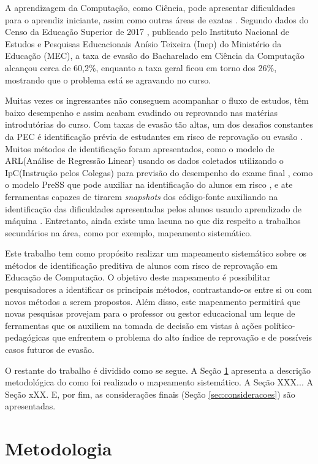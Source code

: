 \documentclass[12pt]{article}
\begin{document}
A aprendizagem da Computação, como Ciência, pode apresentar dificuldades para o aprendiz iniciante, assim como outras áreas de exatas \cite{Blando2015}. Segundo dados do Censo da Educação Superior de 2017 \cite{Inep2017}, publicado pelo Instituto Nacional de Estudos e Pesquisas Educacionais Anísio Teixeira (Inep) do Ministério da Educação (MEC), a taxa de evasão do Bacharelado em Ciência da Computação alcançou cerca de 60,2\%, enquanto a taxa geral ficou em torno dos 26\%, mostrando que o problema está se agravando no curso.

Muitas vezes os ingressantes não conseguem acompanhar o fluxo de estudos, têm baixo desempenho e assim acabam evadindo ou reprovando nas matérias introdutórias do curso. Com taxas de evasão tão altas, um dos desafios constantes da PEC é identificação prévia de estudantes em risco de reprovação ou evasão \cite{Porter2014}. Muitos métodos de identificação foram apresentados, como o modelo de ARL(Análise de Regressão Linear) usando os dados coletados utilizando o IpC(Instrução pelos Colegas) para previsão do desempenho do exame final \cite{Liao2016}, como o modelo PreSS que pode auxiliar na identificação do alunos em risco \cite{Quille2018}, e ate ferramentas capazes de tirarem \textit{snapshots} dos código-fonte auxiliando na identificação das dificuldades apresentadas pelos alunos usando aprendizado de máquina \cite{Ahadi2016a}. Entretanto, ainda existe uma lacuna no que diz respeito a trabalhos secundários na área, como por exemplo, mapeamento sistemático.

Este trabalho tem como propósito realizar um mapeamento sistemático sobre os métodos de identificação preditiva de alunos com risco de reprovação em Educação de Computação. O objetivo deste mapeamento é possibilitar pesquisadores a identificar os principais métodos, contrastando-os entre si ou com novos métodos a serem propostos. Além disso, este mapeamento permitirá que novas pesquisas provejam para o professor ou gestor educacional um leque de ferramentas que os auxiliem na tomada de decisão em vistas à ações político-pedagógicas que enfrentem o problema do alto índice de reprovação e de possíveis casos futuros de evasão.

O restante do trabalho é dividido como se segue. A Seção \ref{sec:metodologia} apresenta a descrição metodológica do como foi realizado o mapeamento sistemático. A Seção XXX... A Seção xXX. E, por fim, as considerações finais (Seção \ref{sec:consideracoes}) são apresentadas.


\section{Metodologia} \label{sec:metodologia}
\end{document}
